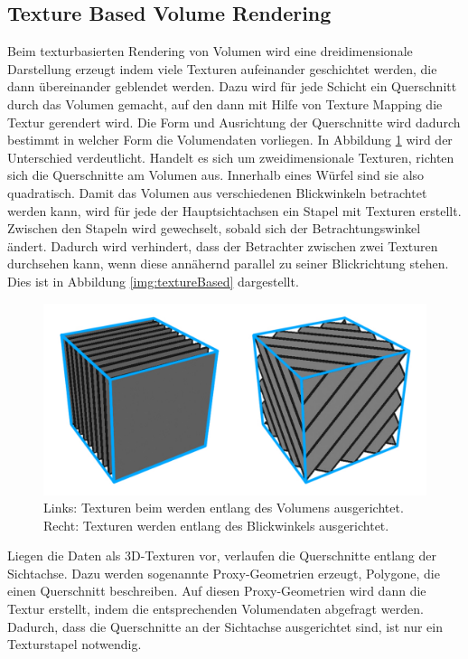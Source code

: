 \subsection{Texture Based Volume Rendering}

Beim texturbasierten Rendering von Volumen wird eine dreidimensionale Darstellung erzeugt indem viele Texturen aufeinander geschichtet werden, die dann übereinander geblendet werden. Dazu wird für jede Schicht ein Querschnitt durch das Volumen gemacht, auf den dann mit Hilfe von Texture Mapping die Textur gerendert wird.
Die Form und Ausrichtung der Querschnitte wird dadurch bestimmt in welcher Form die Volumendaten vorliegen. In Abbildung \ref{img:2D3DTex} wird der Unterschied verdeutlicht. Handelt es sich um zweidimensionale Texturen,  richten sich die Querschnitte am Volumen aus. Innerhalb eines Würfel sind sie also quadratisch. Damit das Volumen aus verschiedenen Blickwinkeln betrachtet werden kann, wird für jede der Hauptsichtachsen ein Stapel mit Texturen erstellt. Zwischen den Stapeln wird gewechselt, sobald sich der Betrachtungswinkel ändert. Dadurch wird verhindert, dass der Betrachter zwischen zwei Texturen durchsehen kann, wenn diese annähernd parallel zu seiner Blickrichtung stehen. Dies ist in Abbildung \ref{img:textureBased} dargestellt.

\begin{figure}[!htb]
	\centering
	\includegraphics[width=0.7\linewidth]{images/texture_2d3d.pdf}
	\caption{Links: Texturen beim werden entlang des Volumens ausgerichtet. Recht: Texturen werden entlang des Blickwinkels ausgerichtet.}
	\label{img:2D3DTex}
\end{figure}
\FloatBarrier

Liegen die Daten als 3D-Texturen vor, verlaufen die Querschnitte entlang der Sichtachse. Dazu werden sogenannte Proxy-Geometrien erzeugt, Polygone, die einen Querschnitt beschreiben. Auf diesen Proxy-Geometrien wird dann die Textur erstellt, indem die entsprechenden Volumendaten abgefragt werden. Dadurch, dass die Querschnitte an der Sichtachse ausgerichtet sind, ist nur ein Texturstapel notwendig. 


